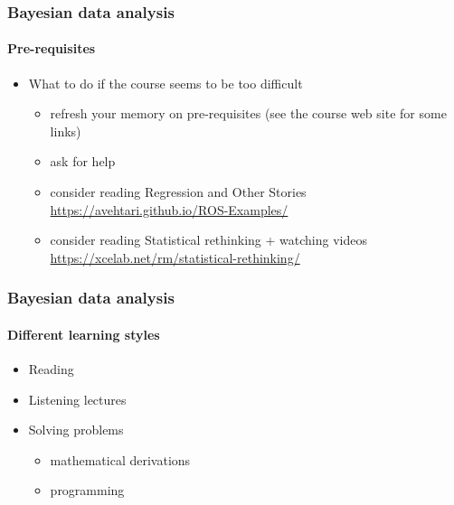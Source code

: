 \documentclass[english]{beamer}
\begin{document}
\begin{frame}
  \frametitle{Bayesian data analysis}  %
  \framesubtitle{Pre-requisites}
  \begin{itemize}
  \item What to do if the course seems to be too difficult
    \begin{itemize}
    \item refresh your memory on pre-requisites (see the course web
      site for some links)
    \item ask for help
    \item consider reading Regression and Other Stories \url{https://avehtari.github.io/ROS-Examples/}
    \item consider reading Statistical rethinking + watching videos \url{https://xcelab.net/rm/statistical-rethinking/}
    \end{itemize}
  \end{itemize}

\end{frame}


\begin{frame}
  \frametitle{Bayesian data analysis}  %
  \framesubtitle{Different learning styles}

  \begin{itemize}
  \item Reading
  \item Listening lectures
  \item Solving problems
    \begin{itemize}
    \item mathematical derivations
    \item programming
    \end{itemize}
  \end{itemize}
  
\end{frame}

  
\end{document}
